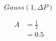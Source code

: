 \begin{equation}
  Gauss(1,\Delta P)
  \label{master}
\end{equation}

\begin{equation} 
  \begin{split}
    A & = \frac{1}{2} \\
    & = 0.5
  \end{split}
  \label{eq1}
\end{equation}

